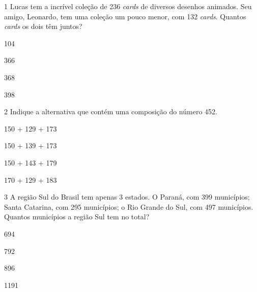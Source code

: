 

\pagebreak
{}

\num{1} Lucas tem a incrível coleção de 236 \emph{cards} de diversos desenhos
animados. Seu amigo, Leonardo, tem uma coleção um pouco menor, com 132
\emph{cards}. Quantos \emph{cards} os dois têm juntos?

\begin{escolha}
\item 104

\item 366

\item 368

\item 398
\end{escolha}

\num{2} Indique a alternativa que contém uma composição do número 452.

\begin{escolha}
\item 150 + 129 + 173

\item 150 + 139 + 173

\item 150 + 143 + 179

\item 170 + 129 + 183
\end{escolha}


\num{3} A região Sul do Brasil tem apenas 3 estados. O Paraná, com 399
municípios; Santa Catarina, com 295 municípios; o Rio Grande do Sul, com
497 municípios. Quantos municípios a região Sul tem no total?

\begin{escolha}
\item 694

\item 792

\item 896

\item 1191
\end{escolha}

